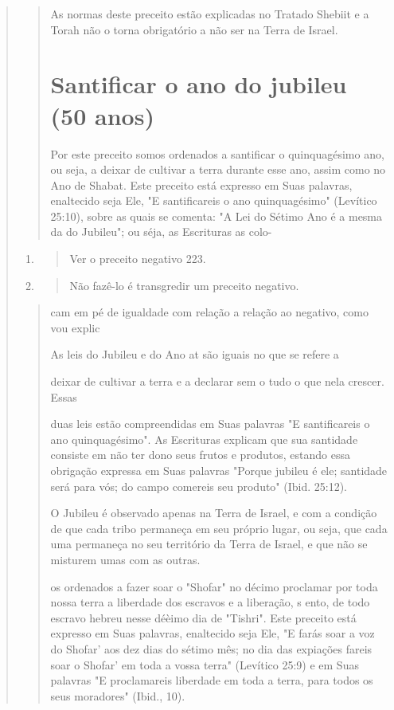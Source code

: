 \begin{quote}
\begin{quote}
As normas deste preceito estão explicadas no Tratado Shebiit e a To­rah
não o torna obrigatório a não ser na Terra de Israel.

\section{Santificar o ano do jubileu (50 anos)}

Por este preceito somos ordenados a santificar o quinquagésimo ano, ou
seja, a deixar de cultivar a terra durante esse ano, assim como no Ano
de Shabat. Este preceito está expresso em Suas palavras, enaltecido seja
Ele, "E santificareis o ano quinquagésimo" (Levítico 25:10), sobre as
quais se comen­ta: "A Lei do Sétimo Ano é a mesma da do Jubileu"; ou
séja, as Escrituras as colo-
\end{quote}

\begin{enumerate}
\def\labelenumi{\arabic{enumi}.}
\setcounter{enumi}{170}
\item
 \begin{quote}
 Ver o preceito negativo 223.
 \end{quote}
\item
 \begin{quote}
 Não fazê-lo é transgredir um preceito negativo.
 \end{quote}
\end{enumerate}

\begin{quote}


cam em pé de igualdade com relação a relação ao negativo, como vou
explic

As leis do Jubileu e do Ano at são iguais no que se refere a

deixar de cultivar a terra e a declarar sem o tudo o que nela crescer.
Essas

duas leis estão compreendidas em Suas palavras "E santificareis o ano
quinqua­gésimo". As Escrituras explicam que sua santidade consiste em
não ter dono seus frutos e produtos, estando essa obrigação expressa em
Suas palavras "Por­que jubileu é ele; santidade será para vós; do campo
comereis seu produto" (Ibid. 25:12).

O Jubileu é observado apenas na Terra de Israel, e com a condição de que
cada tribo permaneça em seu próprio lugar, ou seja, que cada uma
per­maneça no seu território da Terra de Israel, e que não se misturem
umas com as outras.

os ordenados a fazer soar o "Shofar" no décimo proclamar por toda nossa
terra a liberdade dos escravos e a liberação, s ento, de todo escravo
hebreu nesse déèimo dia de "Tishri". Este preceito está expresso em Suas
palavras, enaltecido seja Ele, "E farás soar a voz do Shofar' aos dez
dias do sétimo mês; no dia das expiações fa­reis soar o Shofar' em toda
a vossa terra" (Levítico 25:9) e em Suas palavras "E proclamareis
liberdade em toda a terra, para todos os seus moradores" (Ibid., 10).


\end{quote}
\end{quote}
